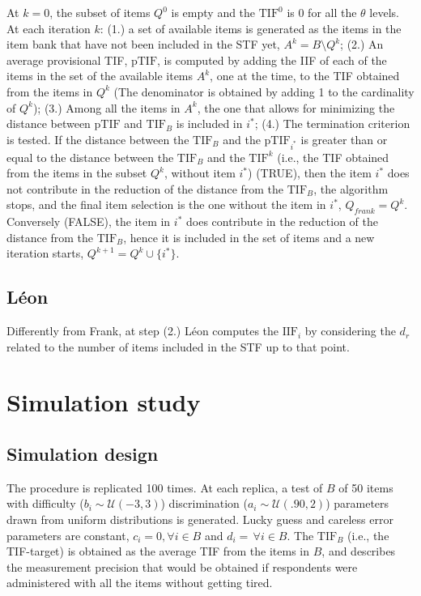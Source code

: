 \documentclass{svproc}
\begin{document}
At $k = 0$, the subset of items $Q^0$ is empty and the $\text{TIF}^0$ is 0 for all the $\theta$ levels. 
At each iteration $k$: (1.) a set of available items is generated as the items in the item bank that have not been included in the STF yet, $A^k = B \setminus Q^k$; (2.)
An average provisional TIF, $\text{pTIF}$, is computed by adding the IIF of each of the items in the set of the available items $A^k$, one at the time, to the TIF obtained from the items in $Q^k$ (The denominator is obtained by adding 1 to the cardinality of $Q^k$); (3.) Among all the items in $A^k$, the one that allows for minimizing the distance between $\text{pTIF}$ and $\text{TIF}_B$ is included in $i^*$; (4.) 
The termination criterion is tested. 
If the distance between the $\text{TIF}_B$ and the $\text{pTIF}_{i^*}$ is greater than or equal to the distance between the $\text{TIF}_B$ and the $\text{TIF}^k$ (i.e., the TIF obtained from the items in the subset $Q^k$, without item $i^*$) (TRUE), then the item $i^*$ does not contribute in the reduction of the distance from the $\text{TIF}_B$, the algorithm stops, and the final item selection is the one without the item in $i^*$, $Q_{frank} = Q^k$. Conversely (FALSE), the item in $i^*$ does contribute in the reduction of the distance from the $\text{TIF}_B$, hence it is included in the set of items and a new iteration starts, $Q^{k+1} = Q^k \cup \{i^*\}$.

\color{blue}
\subsection{Léon}
Differently from Frank, at step (2.) Léon computes the $\text{IIF}_i$ by considering the $d_r$ related to the number of items included in the STF up to that point.  
\normalcolor


\section{Simulation study}

\subsection{Simulation design}



The procedure is replicated 100 times. At each replica, a test of $B$ of 50 items with difficulty ($b_i \sim \mathcal{U}(-3, 3)$) discrimination ($a_i \sim \mathcal{U}(.90, 2)$) parameters drawn from uniform distributions is generated. Lucky 
guess and careless error parameters are constant, $c_i = 0, \forall i \in B$ and $d_i = \, \forall i \in B$.
The $\text{TIF}_B$ (i.e., the TIF-target) is obtained as the average TIF  from the items in $B$, and describes the measurement precision that would be obtained if respondents were administered with all the items without getting tired. 
\end{document}
